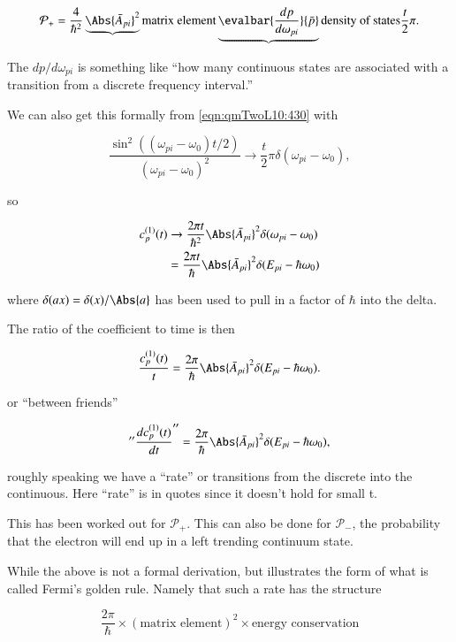 \begin{equation}\label{eqn:qmTwoL10:470}
\mathcal{P}_{+} 
=
\frac{4}{\hbar^2}
\underbrace{
\Abs{
\bar{A}_{pi}
}^2 
}{\text{matrix element}}
\underbrace{\evalbar{\frac{dp}{d\omega_{pi}}}{\bar{p}}}{\text{density of states}}
\frac{t}{2} \pi.
\end{equation}

The $dp/d\omega_{pi}$ is something like ``how many continuous states are associated with a transition from a discrete frequency interval.''

We can also get this formally from \ref{eqn:qmTwoL10:430} with

\begin{equation}\label{eqn:qmTwoL10:490}
\frac{
\sin^2\left( (\omega_{pi} - \omega_0) t/2 \right)
}{
\left( \omega_{pi} - \omega_0 \right)^2
}
\rightarrow 
\frac{t}{2} \pi \delta(\omega_{pi} - \omega_0),
\end{equation}

so

\begin{equation}\label{eqn:qmTwoL10:510}
\begin{aligned}
c_p^{(1)}(t) 
&\rightarrow \frac{2 \pi t}{\hbar^2} 
\Abs{
\bar{A}_{pi}
}^2 
\delta(\omega_{pi} - \omega_0) \\
&=
\frac{2 \pi t}{\hbar} 
\Abs{
\bar{A}_{pi}
}^2 
\delta(E_{pi} - \hbar \omega_0)
\end{aligned}
\end{equation}

where $\delta(ax) = \delta(x)/\Abs{a}$ has been used to pull in a factor of $\hbar$ into the delta.

The ratio of the coefficient to time is then

\begin{equation}\label{eqn:qmTwoL10:530}
\frac{c_p^{(1)}(t) }{t}
=
\frac{2 \pi}{\hbar} 
\Abs{
\bar{A}_{pi}
}^2 
\delta(E_{pi} - \hbar \omega_0).
\end{equation}

or ``between friends''

\begin{equation}\label{eqn:qmTwoL10:550}
''\frac{dc_p^{(1)}(t) }{dt}''
=
\frac{2 \pi}{\hbar} 
\Abs{
\bar{A}_{pi}
}^2 
\delta(E_{pi} - \hbar \omega_0),
\end{equation}

roughly speaking we have a ``rate'' or transitions from the discrete into the continuous.  Here ``rate'' is in quotes since it doesn't hold for small t.

This has been worked out for $\mathcal{P}_{+}$.  This can also be done for $\mathcal{P}_{-}$, the probability that the electron will end up in a left trending continuum state.

While the above is not a formal derivation, but illustrates the form of what is called Fermi's golden rule.  Namely that such a rate has the structure

\begin{equation}\label{eqn:qmTwoL10:570}
\frac{2 \pi}{\hbar} \times (\text{matrix element})^2 \times \text{energy conservation}
\end{equation}

\EndArticle
